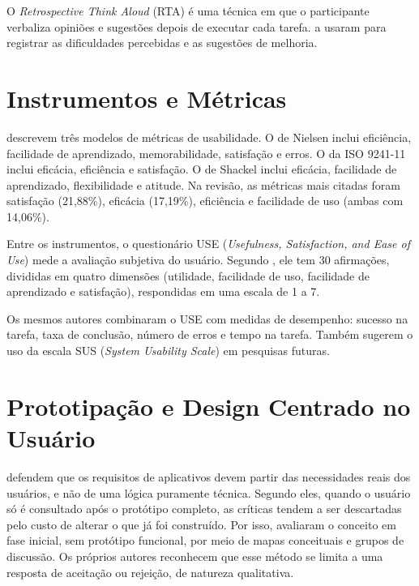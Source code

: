 O \textit{Retrospective Think Aloud} (RTA) é uma técnica em que o participante verbaliza opiniões e sugestões depois de executar cada tarefa.  a usaram para registrar as dificuldades percebidas e as sugestões de melhoria. 

\section{Instrumentos e Métricas}

 descrevem três modelos de métricas de usabilidade. O de Nielsen inclui eficiência, facilidade de aprendizado, memorabilidade, satisfação e erros. O da ISO 9241-11 inclui eficácia, eficiência e satisfação. O de Shackel inclui eficácia, facilidade de aprendizado, flexibilidade e atitude. Na revisão, as métricas mais citadas foram satisfação (21,88\%), eficácia (17,19\%), eficiência e facilidade de uso (ambas com 14,06\%).

Entre os instrumentos, o questionário USE (\textit{Usefulness, Satisfaction, and Ease of Use}) mede a avaliação subjetiva do usuário. Segundo , ele tem 30 afirmações, divididas em quatro dimensões (utilidade, facilidade de uso, facilidade de aprendizado e satisfação), respondidas em uma escala de 1 a 7. 

Os mesmos autores combinaram o USE com medidas de desempenho: sucesso na tarefa, taxa de conclusão, número de erros e tempo na tarefa. Também sugerem o uso da escala SUS (\textit{System Usability Scale}) em pesquisas futuras. 

\section{Prototipação e Design Centrado no Usuário}

 defendem que os requisitos de aplicativos devem partir das necessidades reais dos usuários, e não de uma lógica puramente técnica. Segundo eles, quando o usuário só é consultado após o protótipo completo, as críticas tendem a ser descartadas pelo custo de alterar o que já foi construído. Por isso, avaliaram o conceito em fase inicial, sem protótipo funcional, por meio de mapas conceituais e grupos de discussão. Os próprios autores reconhecem que esse método se limita a uma resposta de aceitação ou rejeição, de natureza qualitativa.

